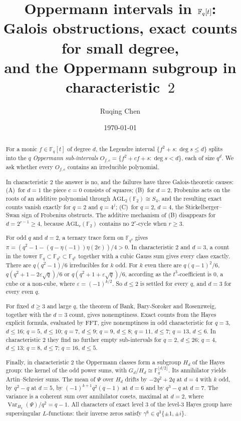 \documentclass[11pt,a4paper]{amsart}
\title[{Oppermann intervals in $\F_q[t]$}]{Oppermann intervals in $\F_q[t]$:\\
Galois obstructions, exact counts for small degree,\\ and the Oppermann subgroup in characteristic~$2$}
\author{Ruqing Chen}
\date{\today}
\theoremstyle{definition}
\theoremstyle{remark}
\newcommand{\F}{\mathbb{F}}
\newcommand{\AGL}{\mathrm{AGL}}
\newcommand{\Var}{\operatorname{Var}}
\begin{document}
\begin{abstract}
For a monic $f\in\F_q[t]$ of degree $d$, the Legendre interval $\{f^2+s:\deg s\le d\}$ splits into the $q$
\emph{Oppermann sub-intervals} $O_{f,c}=\{f^2+cf+s:\deg s<d\}$, each of size $q^d$. We ask whether every $O_{f,c}$
contains an irreducible polynomial.

In characteristic $2$ the answer is no, and the failures have three Galois-theoretic causes:
(A)~for $d=1$ the piece $c=0$ consists of squares; (B)~for $d=2$, Frobenius acts on the roots of an additive
polynomial through $\AGL_2(\F_2)\cong S_4$, and the resulting exact counts vanish exactly for $q=2$ and $q=4^j$;
(C)~for $q=2$, $d=4$, the Stickelberger--Swan sign of Frobenius obstructs. The additive mechanism of (B) disappears
for $d=2^{r-1}\ge4$, because $\AGL_r(\F_2)$ contains no $2^r$-cycle when $r\ge3$.

For odd $q$ and $d=2$, a ternary trace form on $\F_{q^4}$ gives $\pi=(q^2-1-(q-\eta(-1))\eta(2e))/4>0$. In
characteristic $2$ and $d=3$, a count in the tower $\F_q\subset\F_{q^3}\subset\F_{q^6}$ together with a cubic Gauss sum
gives every class exactly. There are $q(q^2-1)/6$ irreducibles for $k$ odd. For $k$ even there are
$q(q-1)^2/6$, $q(q^2+1-2\varepsilon\sqrt q)/6$ or $q(q^2+1+\varepsilon\sqrt q)/6$, according as the $t^3$-coefficient
is $0$, a cube or a non-cube, where $\varepsilon=(-1)^{k/2}$. So $d\le2$ is settled for every $q$, and $d=3$ for
every even $q$.

For fixed $d\ge3$ and large $q$, the theorem of Bank, Bary-Soroker and Rosenzweig, together with the $d=3$ count,
gives nonemptiness. Exact counts from the Hayes explicit formula, evaluated by FFT, give nonemptiness in odd
characteristic for $q=3$, $d\le16$; $q=5$, $d\le10$; $q=7$, $d\le9$; $q=9$, $d\le8$; $q=11$, $d\le7$; $q=13$, $d\le6$.
In characteristic $2$ they find no further empty sub-intervals for $q=2$, $d\le26$; $q=4$, $d\le13$; $q=8$, $d\le7$;
$q=16$, $d\le5$.

Finally, in characteristic $2$ the Oppermann classes form a subgroup $H_d$ of the Hayes group: the kernel of the odd
power sums, with $G_d/H_d\cong\F_q^{\lfloor d/2\rfloor}$. Its annihilator yields Artin--Schreier sums. The mean of
$\Psi$ over $H_d$ drifts by $-2q^2+2q$ at $d=4$ with $k$ odd, by $q^2-q$ at $d=5$, by $(-1)^{k+1}q^2(q-1)$ at $d=6$ and by $q^3-q$ at $d=7$. The
variance is a coherent sum over annihilator cosets, maximal at $d=2$, where $\Var_{H_2}(\Psi)/q^2=q-1$. All
characters of exact level $3$ of the level-$3$ Hayes group have supersingular $L$-functions: their inverse zeros
satisfy $\gamma^6\in q^3\{\pm1,\pm i\}$.
\end{abstract}
\end{document}
